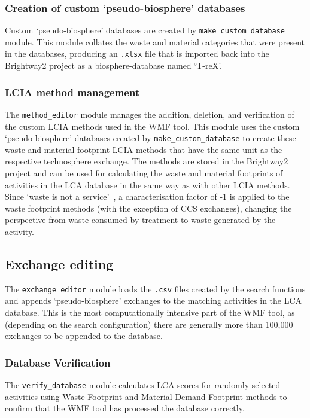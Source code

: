 \subsubsection{Creation of custom `pseudo-biosphere' databases}
Custom `pseudo-biosphere' databases are created by \texttt{make\_custom\_database} module. This module collates the waste and material categories that were present in the databases, producing an \texttt{.xlsx} file that is imported back into the Brightway2 project as a biosphere-database named `T-reX'. 

\subsubsection{LCIA method management}
The \texttt{method\_editor} module manages the addition, deletion, and verification of the custom LCIA methods used in the WMF tool. This module uses the custom `pseudo-biosphere' databases created by \texttt{make\_custom\_database} to create these waste and material footprint LCIA methods that have the same unit as the respective technosphere exchange. The methods are stored in the Brightway2 project and can be used for calculating the waste and material footprints of activities in the LCA database in the same way as with other LCIA methods. Since `waste is not a service'~\citep{guinee2021wasteisnotaservice}, a characterisation factor of -1 is applied to the waste footprint methods (with the exception of CCS exchanges), changing the perspective from waste consumed by treatment to waste generated by the activity.

\subsection{Exchange editing}
The \texttt{exchange\_editor} module loads the \texttt{.csv} files created by the search functions and appends `pseudo-biosphere' exchanges to the matching activities in the LCA database. This is the most computationally intensive part of the WMF tool, as (depending on the search configuration) there are generally more than 100,000 exchanges to be appended to the database. 

\subsubsection{Database Verification}
The \texttt{verify\_database} module calculates LCA scores for randomly selected activities using Waste Footprint and Material Demand Footprint methods to confirm that the WMF tool has processed the database correctly.

